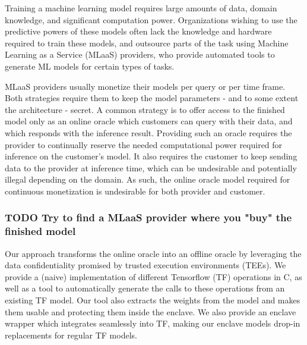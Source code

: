 \documentclass[11pt]{article}
\begin{document}
Training a machine learning model requires large amounts of data, domain knowledge, and significant computation power.
Organizations wishing to use the predictive powers of these models often lack the knowledge and hardware required to train these models, and outsource parts of the task using Machine Learning as a Service (MLaaS) providers, who provide automated tools to generate ML models for certain types of tasks.

MLaaS providers usually monetize their models per query or per time frame.
Both strategies require them to keep the model parameters - and to some extent the architecture - secret.
A common strategy is to offer access to the finished model only as an online oracle which customers can query with their data, and which responds with the inference result.
Providing such an oracle requires the provider to continually reserve the needed computational power required for inference on the customer's model.
It also requires the customer to keep sending data to the provider at inference time, which can be undesirable and potentially illegal depending on the domain.
As such, the online oracle model required for continuous monetization is undesirable for both provider and customer.

\subsubsection{{\bfseries\sffamily TODO} Try to find a MLaaS provider where you "buy" the finished model}
\label{sec:org9079b7a}

Our approach transforms the online oracle into an offline oracle by leveraging the data confidentiality promised by trusted execution environments (TEEs).
We provide a (naive) implementation of different Tensorflow (TF) operations in C, as well as a tool to automatically generate the calls to these operations from an existing TF model.
Our tool also extracts the weights from the model and makes them usable and protecting them inside the enclave.
We also provide an enclave wrapper which integrates seamlessly into TF, making our enclave models drop-in replacements for regular TF models.
\end{document}
